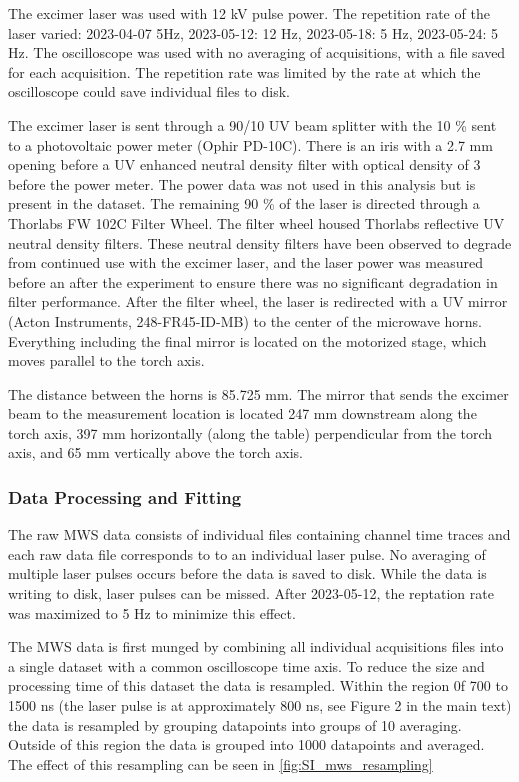 The excimer laser was used with 12 kV pulse power. The repetition rate of the laser varied: 2023-04-07 5Hz, 2023-05-12: 12 Hz, 2023-05-18: 5 Hz, 2023-05-24: 5 Hz. The oscilloscope was used with no averaging of acquisitions, with a file saved for each acquisition. The repetition rate was limited by the rate at which the oscilloscope could save individual files to disk. 

The excimer laser is sent through a 90/10 UV beam splitter with the 10 \% sent to a photovoltaic power meter (Ophir PD-10C). There is an iris with a 2.7  mm opening before a UV enhanced neutral density filter with optical density of 3 before the power meter. The power data was not used in this analysis but is present in the dataset. The remaining 90 \% of the laser is directed through a Thorlabs FW 102C Filter Wheel. The filter wheel housed Thorlabs reflective UV neutral density filters. These neutral density filters have been observed to degrade from continued use with the excimer laser, and the laser power was measured before an after the experiment to ensure there was no significant degradation in filter performance. After the filter wheel, the laser is redirected with a UV mirror (Acton Instruments, 248-FR45-ID-MB) to the center of the microwave horns. Everything including the final mirror is located on the motorized stage, which moves parallel to the torch axis.  

The distance between the horns is 85.725 mm. The mirror that sends the excimer beam to the measurement location is located 247 mm downstream along the torch axis, 397 mm horizontally (along the table) perpendicular from the torch axis, and 65 mm vertically above the torch axis. 


\subsubsection{Data Processing and Fitting}

The raw MWS data consists of individual files containing channel time traces and each raw data file corresponds to to an individual laser pulse. No averaging of multiple laser pulses occurs before the data is saved to disk. While the data is writing to disk, laser pulses can be missed. After 2023-05-12,  the reptation rate was maximized to 5 Hz to minimize this effect. 

The MWS data is first munged by combining all individual acquisitions files into a single dataset with a common oscilloscope time axis. To reduce the size and processing time of this dataset the data is resampled. Within the region 0f 700 to 1500 ns (the laser pulse is at approximately 800 ns, see Figure 2 in the main text) the data is resampled by grouping datapoints into groups of 10 averaging. Outside of this region the data is grouped into 1000 datapoints and averaged. The effect of this resampling can be seen in \ref{fig:SI_mws_resampling}

